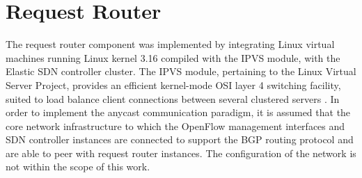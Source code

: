 \section{Request Router}
\label{section:request-router}
The request router component was implemented by integrating Linux virtual machines running Linux kernel 3.16 compiled with the \gls{IPVS} module, with the Elastic \gls{SDN} controller cluster.
The \gls{IPVS} module, pertaining to the Linux Virtual Server Project, provides an efficient kernel-mode \gls{OSI} layer 4 switching facility, suited to load balance client connections between several clustered servers \cite{LVS}.
In order to implement the \gls{anycast} communication paradigm, it is assumed that the core network infrastructure to which the OpenFlow management interfaces and \gls{SDN} controller instances are connected to support the \gls{BGP} routing protocol and are able to peer with request router instances.
The configuration of the network is not within the scope of this work.
%
